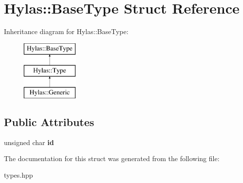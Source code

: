 \hypertarget{structHylas_1_1BaseType}{
\section{Hylas::BaseType Struct Reference}
\label{structHylas_1_1BaseType}
}
Inheritance diagram for Hylas::BaseType:\begin{figure}[H]
\begin{center}
\leavevmode
\includegraphics[height=3.000000cm]{structHylas_1_1BaseType}
\end{center}
\end{figure}
\subsection*{Public Attributes}
\begin{DoxyCompactItemize}
\item 
\hypertarget{structHylas_1_1BaseType_a77356f3ed9464a96a5b0a1a01376c9d2}{
unsigned char {\bfseries id}}
\label{structHylas_1_1BaseType_a77356f3ed9464a96a5b0a1a01376c9d2}

\end{DoxyCompactItemize}


The documentation for this struct was generated from the following file:\begin{DoxyCompactItemize}
\item 
types.hpp\end{DoxyCompactItemize}
